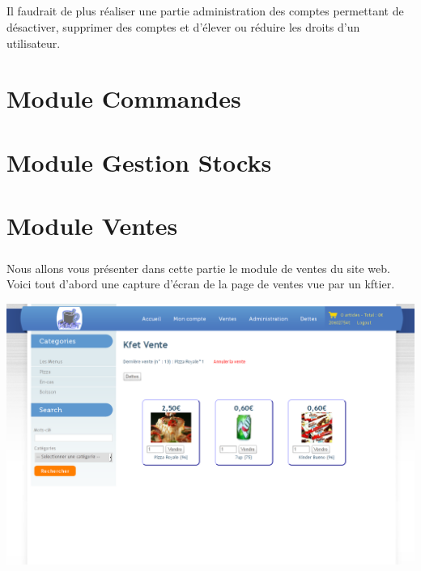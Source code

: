 \documentclass[twoside,UTF8]{EPURapport}
\begin{document}
        \paragraph{}Il faudrait de plus réaliser une partie administration des comptes permettant de désactiver, supprimer des comptes et d'élever ou réduire les droits d'un utilisateur.

\chapter{Module Commandes}

\chapter{Module Gestion Stocks}

\chapter{Module Ventes}%

    \paragraph{}Nous allons vous présenter dans cette partie le module de ventes du site web. Voici tout d'abord une capture d'écran de la page de ventes vue par un kftier.
    \begin{center}
        \includegraphics[width=1\linewidth]{logos/ventes.png}
    \end{center}
\end{document}
